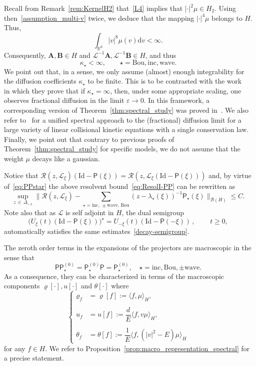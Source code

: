 \documentclass[AHL,Unicode,longabstracts,published]{cedram}
\newcommand{\Id}{\mathrm{Id}}
\renewcommand{\d}{\mathrm{d}}
\newcommand{\Wave}{\mathrm{wave}}
\newcommand{\Inc}{\mathrm{inc}}
\newcommand{\Bou}{\mathrm{Bou}}
\newcommand{\BurA}{{\mathbf{A}}}
\newcommand{\BurB}{{\mathbf{B}}}
\newcommand{\R}{\mathbb{R}}
\newcommand{\LL}{\mathcal{L}}
\newcommand{\PP}{\mathsf{P}}
\newcommand{\RR}{\mathcal{R}}
\newcommand{\BBB}{\mathscr{B}}
\newcommand{\Ss}{H}
\renewcommand*\leq{\leqslant}
\renewcommand*\geq{\geqslant}
\newcommand*\eps{{\varepsilon}}
\newcommand{\la}{\langle}
\newcommand{\ra}{\rangle}
\begin{document}
\begin{rema}
Recall from Remark~\ref{rem:KernelH2} that~\eqref{L4} implies that $|\cdot|^2\mu \in \Ss_2$. Using then~\eqref{assumption_multi-v} twice, we deduce that the mapping $| \cdot |^4\mu$ belongs to $\Ss$. Thus,
\[
\int_{\R^d}|v|^8\mu(v)\d v < \infty.
\]
Consequently, $\BurA, \BurB \in \Ss$ and $\LL^{-1}\BurA,\LL^{-1}\BurB \in \Ss$, and thus
\[
\kappa_\star < \infty, \qquad \star=\Bou,\Inc,\Wave.
\]
We point out that, in a sense, we only assume (almost) enough integrability for the diffusion coefficients $\kappa_\star$ to be finite. This is to be contrasted with the work~\cite{Mellet} in which they prove that if $\kappa_\star = \infty$, then, under some appropriate scaling, one observes fractional diffusion in the limit $\eps \to 0$. In this framework, a corresponding version of Theorem~\ref{thm:spectral_study} was proved in~\cite{Puel}. We also refer to~\cite{BM} for a unified spectral approach to the (fractional) diffusion limit for a large variety of linear collisional kinetic equations with a single conservation law. Finally, we point out that contrary to previous proofs of Theorem~\ref{thm:spectral_study} for specific models, we do not assume that the weight $\mu$ decays like a gaussian.
\end{rema}
\begin{rema}
Notice that $\RR(z,\LL_{\xi})(\Id-\PP(\xi))=\RR(z,\LL_{\xi}(\Id-\PP(\xi)))$ and, by virtue of~\eqref{eq:PPstar} the above resolvent bound~\eqref{eq:ResolI-PP} can be rewritten as
\[
\sup_{z\, \in\,\Delta_{-\lambda}}\bigg\|\RR(z,\LL_{\xi})-\sum_{\star=\Inc,\,\pm\Wave,\,\Bou}\left(z-\lambda_{\star}(\xi)\right)^{-1}\PP_{\star}(\xi)\bigg\|_{\BBB(\Ss)} \leq C.
\]
Note also that as $\LL$ is self adjoint in {$\Ss$}, the dual semigroup
\[
\Big(U_{\xi}(t) \left(\Id - \PP(\xi)\right) \Big)^\star = U_{-\xi}(t) \left(\Id - \PP(-\xi)\right) \,,\, \qquad t \geq 0,
\]
automatically satisfies the same estimates~\eqref{decay-semigroup}.
\end{rema}

\begin{rema}\label{rem:macro_representation_spectral}
The zeroth order terms in the expansions of the projectors are macroscopic in the sense that
\[
\PP \PP^{(0)}_\star = \PP^{(0)}_\star \PP = \PP^{(0)}_\star, \quad \star = \Inc, \Bou, \pm \Wave.
\]
As a consequence, they can be characterized in terms of the macroscopic components $\varrho[\cdot], u[\cdot]$ and $\theta[\cdot]$ where
\begin{equation}\label{eq:fluctuat}
\begin{cases}
\varrho_f &= \varrho[f] := \la f, \mu \ra_\Ss, \\
\\
u_f & = u[f] := \dfrac{d}{E} \la f, v \mu \ra_\Ss,\\
\\
\theta_f &= \theta[f] := \dfrac{1}{E} \big\la f, \left(|v|^2 - E\right) \mu \big\ra_\Ss
\end{cases}
\end{equation}
for any $f\in \Ss.$ We refer to Proposition~\ref{prop:macro_representation_spectral} for a precise statement.
\end{rema}
\end{document}
